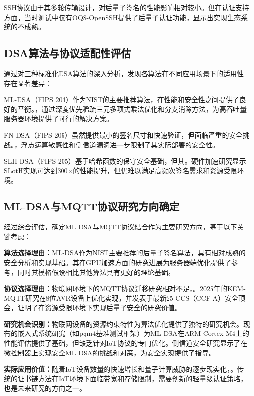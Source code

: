 \documentclass{article}
\begin{document}
SSH协议由于其多轮传输设计，对后量子签名的性能影响相对较小。但在认证支持方面，当时测试中仅有OQS-OpenSSH提供了后量子认证功能，显示出实现生态系统的不成熟。

\subsection{DSA算法与协议适配性评估}

通过对三种标准化DSA算法的深入分析，发现各算法在不同应用场景下的适用性存在显著差异：

ML-DSA（FIPS 204）作为NIST的主要推荐算法，在性能和安全性之间提供了良好的平衡。，通过深度优先稀疏三元多项式乘法优化和分支消除方法，为高吞吐量服务器环境提供了可行的解决方案。

FN-DSA（FIPS 206）虽然提供最小的签名尺寸和快速验证，但面临严重的安全挑战。，浮点运算敏感性和侧信道漏洞进一步限制了其实际部署的安全性。

SLH-DSA（FIPS 205）基于哈希函数的保守安全基础，但其。硬件加速研究显示SLotH实现可达到300×的性能提升，但仍难以满足高频次签名需求和资源受限环境。

\subsection{ML-DSA与MQTT协议研究方向确定}

经过综合评估，确定ML-DSA与MQTT协议结合作为主要研究方向，基于以下关键考虑：

\textbf{算法选择理由：}ML-DSA作为NIST主要推荐的后量子签名算法，具有相对成熟的安全分析和实现基础。其在GPU加速方面的研究进展为服务器端优化提供了参考，同时其模格假设相比其他算法具有更好的理论基础。

\textbf{协议选择理由：}物联网环境下的MQTT协议迁移研究相对不足，。2025年的KEM-MQTT研究在8位AVR设备上优化实现，并发表于最新25-CCS（CCF-A）安全顶会，证明了在资源受限环境下实现后量子安全的研究价值。

\textbf{研究机会识别：}物联网设备的资源约束特性为算法优化提供了独特的研究机会。现有的嵌入式系统研究（如pqm4基准测试框架）为ML-DSA在ARM Cortex-M4上的性能评估提供了基础，但缺乏针对IoT协议的专门优化。侧信道安全研究显示了在微控制器上实现安全ML-DSA的挑战和对策，为安全实现提供了指导。

\textbf{实际应用价值：}随着IoT设备数量的快速增长和量子计算威胁的逐步现实化，。传统的证书链方法在IoT环境下面临带宽和存储限制，需要创新的轻量级认证策略，也是未来研究的方向之一。

\end{document}
